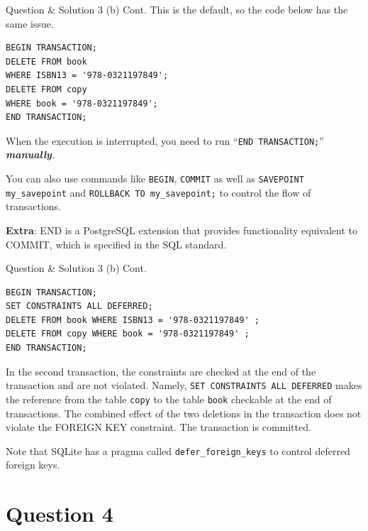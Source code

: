 \begin{frame}[fragile]{Question \& Solution 3 (b) Cont.}
This is the default, so the code below has the same issue.

\begin{lstlisting}
BEGIN TRANSACTION;
DELETE FROM book 
WHERE ISBN13 = '978-0321197849';
DELETE FROM copy 
WHERE book = '978-0321197849';
END TRANSACTION;
\end{lstlisting}

When the execution is interrupted, you need to run ``\texttt{END TRANSACTION;}'' {\color{red} \textbf{\textit{manually}}}. \vspace{5pt}

You can also use commands like \texttt{BEGIN}, \texttt{COMMIT} as well as  \texttt{SAVEPOINT my\_savepoint} and \texttt{ROLLBACK TO my\_savepoint;} to control the flow of transactions.\vspace{5pt}

\textbf{Extra}: END is a PostgreSQL extension that provides functionality equivalent to COMMIT, which is specified in the SQL standard.

\end{frame}


\begin{frame}[fragile]{Question \& Solution 3 (b) Cont.}

\begin{lstlisting}
BEGIN TRANSACTION;
SET CONSTRAINTS ALL DEFERRED;
DELETE FROM book WHERE ISBN13 = '978-0321197849' ;
DELETE FROM copy WHERE book = '978-0321197849' ;
END TRANSACTION;
\end{lstlisting}

In the second transaction, the constraints are checked at the end of the transaction and are not violated.  Namely, \texttt{SET CONSTRAINTS ALL DEFERRED} makes the reference from the table \texttt{copy} to the table \texttt{book} checkable at the end of transactions. The combined effect of the two deletions in the transaction does not violate the FOREIGN KEY constraint. The transaction is committed. \vspace{10pt}

Note that SQLite has a pragma called \texttt{defer\_foreign\_keys} to control deferred foreign keys.
\end{frame}

\section*{Question 4}

